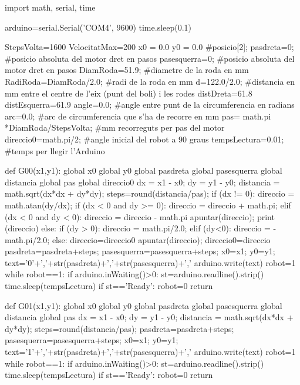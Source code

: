 \begin{python}
	import math, serial, time
	
	arduino=serial.Serial('COM4', 9600)
	time.sleep(0.1)
	
	StepsVolta=1600
	VelocitatMax=200
	x0 = 0.0
	y0 = 0.0
	#posicio[2];
	pasdreta=0; #posicio absoluta del motor dret en pasos
	pasesquerra=0; #posicio absoluta del motor dret en pasos
	DiamRoda=51.9; #diametre de la roda en mm
	RadiRoda=DiamRoda/2.0; #radi de la roda en mm
	d=122.0/2.0; #distancia en mm entre el centre de l'eix (punt del boli) i les rodes
	distDreta=61.8
	distEsquerra=61.9
	angle=0.0; #angle entre punt de la circumferencia en radians
	arc=0.0; #arc de circumferencia que s'ha de recorre en mm
	pas= math.pi *DiamRoda/StepsVolta; #mm recorreguts per pas del motor
	direccio0=math.pi/2; #angle inicial del robot a 90 graus
	tempsLectura=0.01; #temps per llegir l'Arduino
	
	
	def G00(x1,y1):
		global x0
		global y0
		global pasdreta
		global pasesquerra
		global distancia
		global pas
		global direccio0
		dx = x1 - x0;
		dy = y1 - y0;
		distancia = math.sqrt(dx*dx + dy*dy);
		steps=round(distancia/pas);
		if (dx != 0):
			direccio = math.atan(dy/dx);
			if (dx < 0 and dy >= 0):
				direccio = direccio + math.pi;
			elif (dx < 0 and dy < 0):
				direccio = direccio - math.pi
			apuntar(direccio);
			print (direccio)
		else:
			if (dy > 0):
				direccio = math.pi/2.0;
			elif (dy<0):
				direccio = -math.pi/2.0;
			else:
				direccio=direccio0
			apuntar(direccio);
		direccio0=direccio
		pasdreta=pasdreta+steps;
		pasesquerra=pasesquerra+steps;
		x0=x1;
		y0=y1;
		text='0'+','+str(pasdreta)+','+str(pasesquerra)+','
		arduino.write(text)
		robot=1
		while robot==1:
			if arduino.inWaiting()>0:
				st=arduino.readline().strip()
				time.sleep(tempsLectura)
				if st=='Ready':
					robot=0
		return
	
	def G01(x1,y1):
		global x0
		global y0
		global pasdreta
		global pasesquerra
		global distancia
		global pas
		dx = x1 - x0;
		dy = y1 - y0;
		distancia = math.sqrt(dx*dx + dy*dy);
		steps=round(distancia/pas);
		pasdreta=pasdreta+steps;
		pasesquerra=pasesquerra+steps;
		x0=x1;
		y0=y1;
		text='1'+','+str(pasdreta)+','+str(pasesquerra)+','
		arduino.write(text)
		robot=1
		while robot==1:
			if arduino.inWaiting()>0:
				st=arduino.readline().strip()
				time.sleep(tempsLectura)
				if st=='Ready':
					robot=0
		return
	

\end{python}
